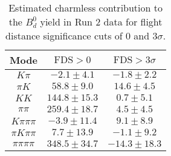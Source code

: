 \begin{table}[h]
  \centering
  \begin{tabular}{ccc}
      \toprule
      Mode & $\mathrm{FDS} > 0$ & $\mathrm{FDS} > 3\sigma$ \\
      \midrule
      $K\pi$ & $-2.1 \pm 4.1$ & $-1.8 \pm 2.2$ \\
      $\pi K$ & $58.8 \pm 9.0$ & $14.6 \pm 4.5$ \\
      $KK$ & $144.8 \pm 15.3$ & $0.7 \pm 5.1$ \\
      $\pi\pi$ & $259.4 \pm 18.7$ & $4.5 \pm 4.5$ \\
      $K\pi\pi\pi$ & $-3.9 \pm 11.4$ & $9.1 \pm 8.9$ \\
      $\pi K\pi\pi$ & $7.7 \pm 13.9$ & $-1.1 \pm 9.2$ \\
      $\pi\pi\pi\pi$ & $348.5 \pm 34.7$ & $-14.3 \pm 18.3$ \\
      \bottomrule
  \end{tabular}
  \caption{\small Estimated charmless contribution to the $B^{0}_{d}$ yield in Run 2 data for flight distance significance cuts of 0  and $3\sigma$.}
\label{tab:charmless_yields_Bd_run_2}
\end{table}
